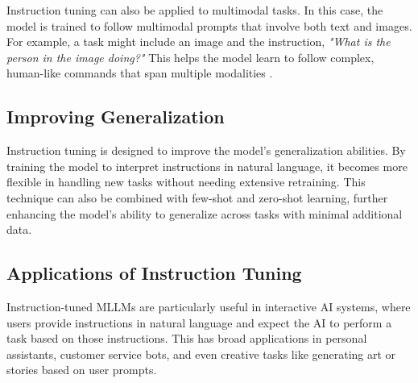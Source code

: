 Instruction tuning can also be applied to multimodal tasks. In this case, the model is trained to follow multimodal prompts that involve both text and images. For example, a task might include an image and the instruction, \textit{"What is the person in the image doing?"} This helps the model learn to follow complex, human-like commands that span multiple modalities \cite{MultimodalInstructionTuning2024}.


\subsection{Improving Generalization}

Instruction tuning is designed to improve the model’s generalization abilities. By training the model to interpret instructions in natural language, it becomes more flexible in handling new tasks without needing extensive retraining. This technique can also be combined with few-shot and zero-shot learning, further enhancing the model’s ability to generalize across tasks with minimal additional data.

\subsection{Applications of Instruction Tuning}

Instruction-tuned MLLMs are particularly useful in interactive AI systems, where users provide instructions in natural language and expect the AI to perform a task based on those instructions. This has broad applications in personal assistants, customer service bots, and even creative tasks like generating art or stories based on user prompts.


